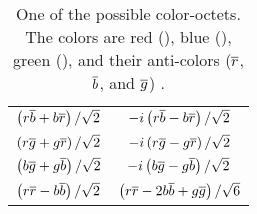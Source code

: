 \begin{table}[h]
    \centering
    \begin{center}
        \begin{tabular}{c  c}
            $\left( r \overline{b} + b \overline{r} \right) / \sqrt{2}$ &
            $-i \left( r \overline{b} - b \overline{r} \right) / \sqrt{2}$ \\
            $\left( r \overline{g} + g \overline{r} \right) / \sqrt{2}$ &
            $-i \left( r \overline{g} - g \overline{r} \right) / \sqrt{2}$ \\
            $\left( b \overline{g} + g \overline{b} \right) / \sqrt{2}$ &
            $-i \left( b \overline{g} - g \overline{b} \right) / \sqrt{2}$ \\
            $\left( r \overline{r} - b \overline{b} \right) / \sqrt{2}$ &
            $\left( r \overline{r} - 2b \overline{b} + g \overline{g} \right) / \sqrt{6}$ \\
        \end{tabular}
        \caption[
            One possible QCD color-octet.
        ]{
            One of the possible color-octets. The colors are red (\red), blue
            (\blue), green (\green), and their anti-colors ($\overline{r}$,
            $\overline{b}$, and $\overline{g}$) .
        }
        \label{table:gluon_color}
    \end{center}
\end{table}
